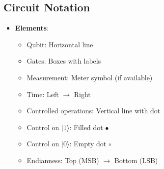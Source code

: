 \begin{multicols}{3}
    \section*{Circuit Notation}
    \begin{itemize}[leftmargin=*,nosep,topsep=0pt]
      \item \textbf{Elements}:
        \begin{itemize}[nosep]
          \item Qubit: Horizontal line
          \item Gates: Boxes with labels
          \item Measurement: Meter symbol (if available)
          \item Time: Left $\to$ Right
          \item Controlled operations: Vertical line with dot
          \item Control on $|1\rangle$: Filled dot $\bullet$
          \item Control on $|0\rangle$: Empty dot $\circ$
          \item Endianness: Top (MSB) $\to$ Bottom (LSB)
        \end{itemize}
    \end{itemize}



\end{multicols}
